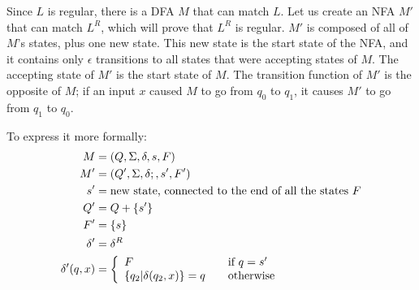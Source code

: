 

Since $L$ is regular, there is a DFA $M$ that can match $L$. Let us create an NFA $M'$ that can match $L^R$, which will prove that $L^R$ is regular.
$M'$ is composed of all of $M$'s states, plus one new state. This new state is the start state of the NFA, and it contains only $\epsilon$ transitions to all states that were accepting states of $M$. The accepting state of $M'$ is the start state of $M$. The transition function of $M'$ is the opposite of $M$; if an input $x$ caused $M$ to go from $q_0$ to $q_1$, it causes $M'$ to go from $q_1$ to $q_0$.

To express it more formally:
\begin{align*}
M &= (Q, \Sigma, \delta, s, F) \\
M' &= (Q', \Sigma, \delta;, s', F') \\
s' &= \text{new state, connected to the end of all the states }F \\
Q' &= Q + \{ s' \} \\
F' &= \{ s \} \\
\delta' &= \delta^R \\
\delta'(q,x) &= \left\{ 
  \begin{array}{l l}
    F & \quad \text{if } q = s' \\
    \{q_2 | \delta(q_2,x)\} = q & \quad \text{otherwise}
  \end{array} \right.
\end{align*}

